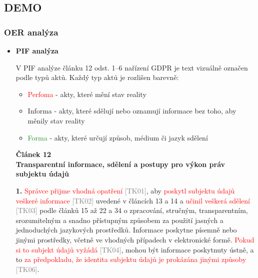 
\subsection{DEMO}
\label{sec:demo}

\subsubsection{OER analýza}
\label{sec:oer-analyza}

\begin{itemize}
  \item \textbf{PIF analýza}
   
  V PIF analýze článku 12 odst. 1–6 nařízení GDPR je text vizuálně označen podle typů aktů. Každý typ aktů je rozlišen barevně:
  \begin{itemize}
    \item \textcolor{red}{Perfoma} - akty, které mění stav reality
    \item \textcolor{NavyBlue}{Informa} - akty, které sdělují nebo oznamují informace bez toho, aby měnily stav reality
    \item \textcolor{ForestGreen}{Forma} - akty, které určují způsob, médium či jazyk sdělení 
  \end{itemize}
  
  \vspace{1em}

  \noindent \textbf{Článek 12} \\
  \textbf{Transparentní informace, sdělení a postupy pro výkon práv subjektu údajů}

  \vspace{0.5em}
  \textbf{1.} \textcolor{red}{Správce přijme vhodná opatření} \textcolor{gray}{[TK01]}, aby \textcolor{red}{poskytl subjektu údajů veškeré informace} \textcolor{gray}{[TK02]} uvedené v článcích 13 a 14 a \textcolor{red}{učinil veškerá sdělení} \textcolor{gray}{[TK03]} podle článků 15 až 22 a 34 o zpracování, \textcolor{OliveGreen}{stručným, transparentním, srozumitelným a snadno přístupným způsobem za použití jasných a jednoduchých jazykových prostředků}.  
  \textcolor{NavyBlue}{Informace poskytne} \textcolor{OliveGreen}{písemně nebo jinými prostředky, včetně ve vhodných případech v elektronické formě.}  
  \textcolor{red}{Pokud si to subjekt údajů vyžádá} \textcolor{gray}{[TK04]}, \textcolor{NavyBlue}{mohou být informace poskytnuty} \textcolor{OliveGreen}{ústně}, a to \textcolor{red}{za předpokladu, že identita subjektu údajů je prokázána jinými způsoby} \textcolor{gray}{[TK06]}.


\end{itemize}
